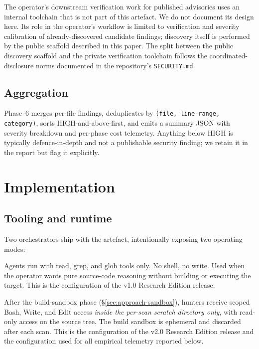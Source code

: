 \documentclass[11pt,a4paper]{article}
\begin{document}
The operator's downstream verification work for published advisories
uses an internal toolchain that is not part of this artefact. We do
not document its design here. Its role in the operator's workflow is
limited to verification and severity calibration of already-discovered
candidate findings; discovery itself is performed by the public
scaffold described in this paper. The split between the public
discovery scaffold and the private verification toolchain follows the
coordinated-disclosure norms documented in the repository's
\texttt{SECURITY.md}.

\subsection{Aggregation}

Phase~6 merges per-file findings, deduplicates by
\texttt{(file, line-range, category)}, sorts
HIGH-and-above-first, and emits a summary JSON with severity breakdown and
per-phase cost telemetry. Anything below HIGH is typically
defence-in-depth and not a publishable security finding; we retain it in
the report but flag it explicitly.

\section{Implementation}
\label{sec:implementation}

\subsection{Tooling and runtime}

Two orchestrators ship with the artefact, intentionally exposing two
operating modes:

\begin{description}[leftmargin=14pt,style=nextline,font=\normalfont\itshape]
  \item[Static mode (\texttt{scripts/mythos-v3.sh}, seven phases).]
  Agents run with read, grep, and glob tools only. No shell, no write.
  Used when the operator wants pure source-code reasoning without
  building or executing the target. This is the configuration of the
  v1.0 Research Edition release.
  \item[Live-tool mode (\texttt{scripts/mythos-v4.sh}, eight phases, current default).]
  After the build-sandbox phase (\S\ref{sec:approach-sandbox}), hunters
  receive scoped Bash, Write, and Edit access \emph{inside the
  per-scan scratch directory only}, with read-only access on the
  source tree. The build sandbox is ephemeral and discarded after each
  scan. This is the configuration of the v2.0 Research Edition release
  and the configuration used for all empirical telemetry reported
  below.
\end{description}
\end{document}
